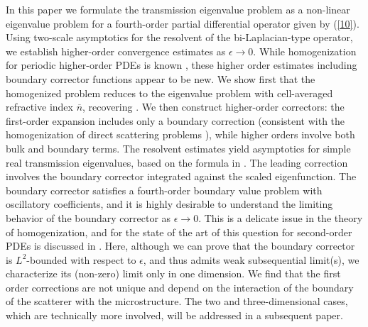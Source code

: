 \documentclass[10pt,a4paper]{amsart}
\begin{document}
\medskip
\noindent
In this paper we formulate the transmission eigenvalue problem as a non-linear eigenvalue problem for a fourth-order partial differential operator given by (\ref{10}). Using two-scale asymptotics for the resolvent of the bi-Laplacian-type operator, we establish higher-order convergence estimates as $\epsilon \to 0$. While homogenization for periodic higher-order PDEs is known \cite{ Fr, high2, high,Pa}, these higher order estimates including boundary corrector functions appear to be new. We show first that the homogenized problem reduces to the eigenvalue problem with cell-averaged refractive index ${\overline n}$, recovering \cite{CaHaHa}. We then construct higher-order correctors: the first-order expansion includes only a boundary correction (consistent with the homogenization of direct scattering problems \cite{CaMoPa,CaGuMoPa}), while higher orders involve both bulk and boundary terms. The resolvent estimates yield asymptotics for simple real transmission eigenvalues, based on the formula in \cite[Theorem 3.2]{FuMo}. The leading correction involves the  boundary corrector integrated against the scaled eigenfunction. The boundary corrector satisfies a fourth-order boundary value problem with oscillatory coefficients, and it is highly desirable to understand the limiting behavior of  the boundary corrector as $\epsilon \to 0$. This  is a delicate issue in the theory of homogenization, and for the state of the art of this question for second-order PDEs is  discussed in \cite{GeMa1, GeMa2, MoVo1, SaVo}. Here, although we can prove that the boundary corrector is $L^2$-bounded with respect to $\epsilon$, and thus admits weak subsequential limit(s), we characterize its (non-zero) limit only in one dimension. We find that the first order corrections are not unique and depend on the interaction of the boundary of
the scatterer with the microstructure.  The two and three-dimensional cases, which are technically more involved, will be addressed in a subsequent paper.  
 
\end{document}
